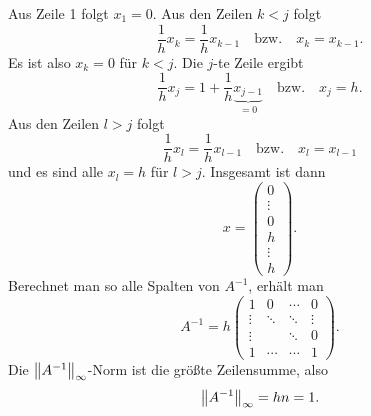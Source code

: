 \documentclass{exercise}
\begin{document}
    Aus Zeile 1 folgt \(x_1 = 0\).
    Aus den Zeilen \(k < j\) folgt
    \[
        \frac{1}{h}x_k = \frac{1}{h}x_{k - 1} \quad \text{bzw.} \quad x_k = x_{k - 1}.
    \]
    Es ist also \(x_k = 0\) für \(k < j\).
    Die \(j\)-te Zeile ergibt
    \[
        \frac{1}{h}x_j = 1 + \frac{1}{h}\underbrace{x_{j - 1}}_{= 0} \quad \text{bzw.} \quad x_j = h.
    \]
    Aus den Zeilen \(l > j\) folgt
    \[
        \frac{1}{h}x_l = \frac{1}{h}x_{l - 1} \quad \text{bzw.} \quad x_l = x_{l - 1}
    \]
    und es sind alle \(x_l = h\) für \(l > j\).
    Insgesamt ist dann
    \[
        x = \begin{pmatrix}
            0\\
            \vdots\\
            0\\
            h\\
            \vdots\\
            h
        \end{pmatrix}.
    \]
    Berechnet man so alle Spalten von \(A^{-1}\), erhält man
    \[
        A^{-1} = h\begin{pmatrix}
            1 & 0 & \cdots & 0\\
            \vdots & \ddots & \ddots & \vdots\\
            \vdots & & \ddots & 0\\
            1 & \cdots & \cdots & 1
        \end{pmatrix}.
    \]
    Die \(\norm*{A^{-1}}_\infty\)-Norm ist die größte Zeilensumme, also
    \[
        \norm*{A^{-1}}_\infty = hn = 1.
    \]
\end{document}
